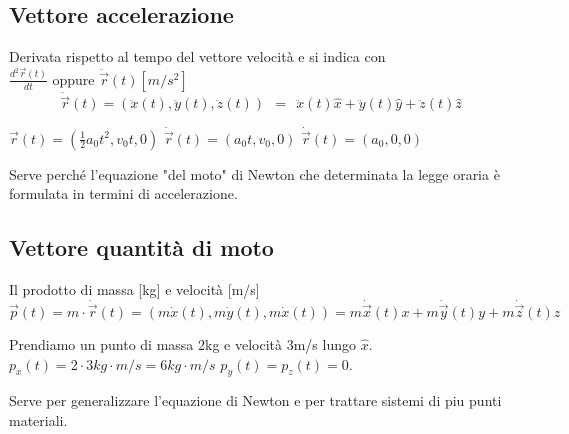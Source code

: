 \subsection{Vettore accelerazione}
Derivata rispetto al tempo del vettore velocità e si indica con $\frac{d^2\vec{r}(t)}{dt} \text{ oppure } \ddot{\vec{r}}(t) [m/s^2]$
\begin{equation}
    \ddot{\vec{r}}(t) = (\ddot{x}(t), \ddot{y}(t), \ddot{z}(t))\:\: = \:\: \ddot{x}(t)\hat{x} + \ddot{y}(t)\hat{y} + \ddot{z}(t)\hat{z}
\end{equation}
\begin{example}
    $\vec{r}(t)= (\frac{1}{2}a_0t^2, v_0t, 0)$ \hspace{10pt} $\dot{\vec{r}}(t) = (a_0t, v_0, 0)$ \hspace{10pt} $\dot{\vec{r}}(t) = (a_0, 0, 0)$
\end{example}
\hspace{-15pt}Serve perché l'equazione "del moto" di Newton che determinata la legge oraria è formulata in termini di accelerazione.

\subsection{Vettore quantità di moto}
Il prodotto di massa [kg] e velocità [m/s]
$$\vec{p}(t) = m \cdot \dot{\vec{r}}(t) = (m\dot{x}(t), m\dot{y}(t), m\dot{x}(t)) = m\dot{\vec{x}}(t)x + m\dot{\vec{y}}(t)y + m \dot{\vec{z}}(t)z$$
\begin{example}
    Prendiamo un punto di massa 2kg e velocità 3m/s lungo $\hat{x}$.\\
    $p_x(t) = 2 \cdot 3 kg\cdot m/s = 6 kg \cdot m/s$ \hspace{15pt} $p_y(t) = p_z(t) = 0$.
\end{example}
\hspace{-15pt}Serve per generalizzare l'equazione di Newton e per trattare sistemi di piu punti materiali.

